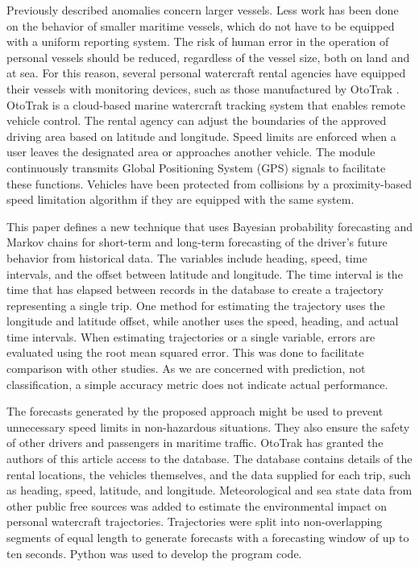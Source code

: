 \documentclass[preprint,12pt]{elsarticle}
\begin{document}
Previously described anomalies \citep{2014Mascaro, 2008Laxhammar} concern larger vessels. Less work has been done on the behavior of smaller maritime vessels, which do not have to be equipped with a uniform reporting system. The risk of human error in the operation of personal vessels should be reduced, regardless of the vessel size, both on land and at sea. For this reason, several personal watercraft rental agencies have equipped their vessels with monitoring devices, such as those manufactured by OtoTrak \cite{ototrakOtoTrakTrack}. OtoTrak \cite{ototrakOtoTrakTrack} is a cloud-based marine watercraft tracking system that enables remote vehicle control. The rental agency can adjust the boundaries of the approved driving area based on latitude and longitude. Speed limits are enforced when a user leaves the designated area or approaches another vehicle. The module continuously transmits Global Positioning System (GPS) signals to facilitate these functions. Vehicles have been protected from collisions by a proximity-based speed limitation algorithm if they are equipped with the same system.

This paper defines a new technique that uses Bayesian probability forecasting and Markov chains for short-term and long-term forecasting of the driver's future behavior from historical data. The variables include heading, speed, time intervals, and the offset between latitude and longitude. The time interval is the time that has elapsed between records in the database to create a trajectory representing a single trip. One method for estimating the trajectory uses the longitude and latitude offset, while another uses the speed, heading, and actual time intervals. When estimating trajectories or a single variable, errors are evaluated using the root mean squared error. This was done to facilitate comparison with other studies. As we are concerned with prediction, not classification, a simple accuracy metric does not indicate actual performance.

The forecasts generated by the proposed approach might be used to prevent unnecessary speed limits in non-hazardous situations. They also ensure the safety of other drivers and passengers in maritime traffic. OtoTrak \cite{ototrakOtoTrakTrack} has granted the authors of this article access to the database. The database contains details of the rental locations, the vehicles themselves, and the data supplied for each trip, such as heading, speed, latitude, and longitude. Meteorological and sea state data from other public free sources was added to estimate the environmental impact on personal watercraft trajectories. Trajectories were split into non-overlapping segments of equal length to generate forecasts with a forecasting window of up to ten seconds. Python was used to develop the program code.
\end{document}
